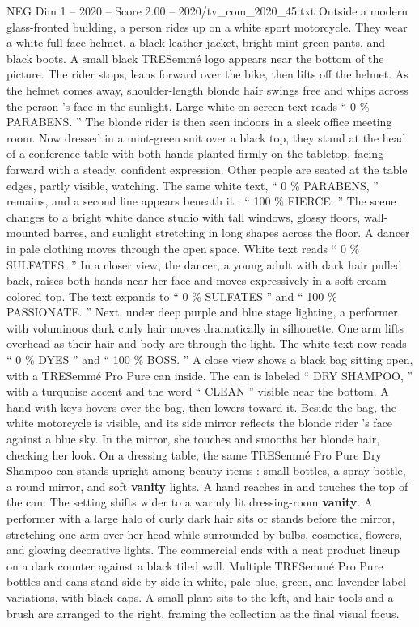 \begin{textsample}{NEG Dim 1 – 2020 – Score 2.00 – 2020/tv\_com\_2020\_45.txt}  \label{ex:f1_neg_085}
Outside a modern glass-fronted building, a person rides up on a white sport motorcycle.
They wear a white full-face helmet, a black leather jacket, bright mint-green pants, and black boots.
A small black TRESemmé logo appears near the bottom of the picture.
The rider stops, leans forward over the bike, then lifts off the helmet.
As the helmet comes away, shoulder-length blonde hair swings free and whips across the person ’s face in the sunlight.
Large white on-screen text reads “ 0 \% PARABENS. ” The blonde rider is then seen indoors in a sleek office meeting room.
Now dressed in a mint-green suit over a black top, they stand at the head of a conference table with both hands planted firmly on the tabletop, facing forward with a steady, confident expression.
Other people are seated at the table edges, partly visible, watching.
The same white text, “ 0 \% PARABENS, ” remains, and a second line appears beneath it : “ 100 \% FIERCE. ” The scene changes to a bright white dance studio with tall windows, glossy floors, wall-mounted barres, and sunlight stretching in long shapes across the floor.
A dancer in pale clothing moves through the open space.
White text reads “ 0 \% SULFATES. ” In a closer view, the dancer, a young adult with dark hair pulled back, raises both hands near her face and moves expressively in a soft cream-colored top.
The text expands to “ 0 \% SULFATES ” and “ 100 \% PASSIONATE. ” Next, under deep purple and blue stage lighting, a performer with voluminous dark curly hair moves dramatically in silhouette.
One arm lifts overhead as their hair and body arc through the light.
The white text now reads “ 0 \% DYES ” and “ 100 \% BOSS. ” A close view shows a black bag sitting open, with a TRESemmé Pro Pure can inside.
The can is labeled “ DRY SHAMPOO, ” with a turquoise accent and the word “ CLEAN ” visible near the bottom.
A hand with keys hovers over the bag, then lowers toward it.
Beside the bag, the white motorcycle is visible, and its side mirror reflects the blonde rider ’s face against a blue sky.
In the mirror, she touches and smooths her blonde hair, checking her look.
On a dressing table, the same TRESemmé Pro Pure Dry Shampoo can stands upright among beauty items : small bottles, a spray bottle, a round mirror, and soft \textbf{vanity} lights.
A hand reaches in and touches the top of the can.
The setting shifts wider to a warmly lit dressing-room \textbf{vanity}.
A performer with a large halo of curly dark hair sits or stands before the mirror, stretching one arm over her head while surrounded by bulbs, cosmetics, flowers, and glowing decorative lights.
The commercial ends with a neat product lineup on a dark counter against a black tiled wall.
Multiple TRESemmé Pro Pure bottles and cans stand side by side in white, pale blue, green, and lavender label variations, with black caps.
A small plant sits to the left, and hair tools and a brush are arranged to the right, framing the collection as the final visual focus.

\end{textsample}
